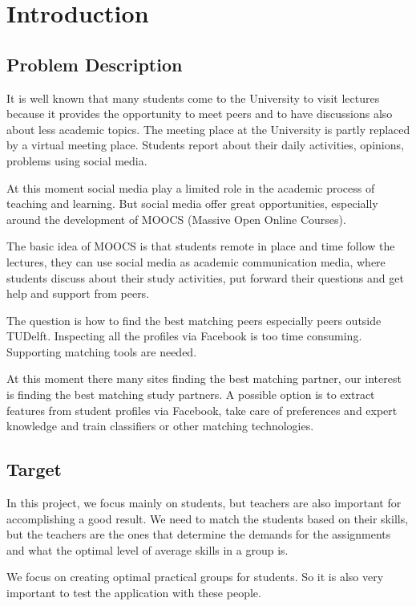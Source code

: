 \chapter{Introduction}

\section{Problem Description}
It is well known that many students come to the University to visit lectures because it provides the opportunity to meet peers and to have discussions also about less academic topics. 
The meeting place at the University is partly replaced by a virtual meeting place. 
Students report about their daily activities, opinions, problems using social media. 

At this moment social media play a limited role in the academic process of teaching and learning. 
But social media offer great opportunities, especially around the development of MOOCS (Massive Open Online Courses). 

The basic idea of MOOCS is that students remote in place and time follow the lectures, they can use social media as academic communication media, where students discuss about their study activities, put forward their questions and get help and support from peers. 

The question is how to find the best matching peers especially peers outside TUDelft. 
Inspecting all the profiles via Facebook is too time consuming. 
Supporting matching tools are needed. 

At this moment there many sites finding the best matching partner, our interest is finding the best matching study partners. 
A possible option is to extract features from student profiles via Facebook, take care of preferences and expert knowledge and train classifiers or other matching technologies.

\section{Target}
In this project, we focus mainly on students, but teachers are also important for accomplishing a good result.
We need to match the students based on their skills, but the teachers are the ones that determine the demands for the assignments and what the optimal level of average skills in a group is.

We focus on creating optimal practical groups for students.
So it is also very important to test the application with these people.

